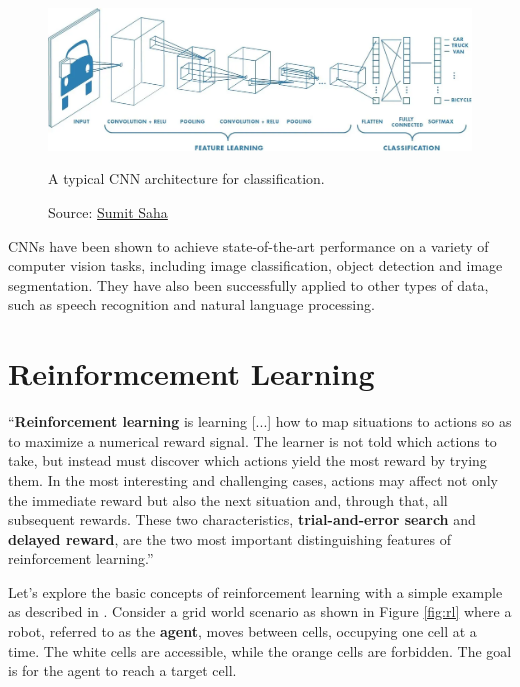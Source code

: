 \begin{figure}[h]
    \centering
    \includegraphics[width=\textwidth]{figures/ch3/8.cnn.png}
    \caption{A typical CNN architecture for classification.}
    \vspace{-10px}
    \caption*{\scriptsize{Source: \href{https://towardsdatascience.com/a-comprehensive-guide-to-convolutional-neural-networks-the-eli5-way-3bd2b1164a53}{Sumit Saha}}}
    \label{fig:cnn}
\end{figure}

CNNs have been shown to achieve state-of-the-art performance on
a variety of computer vision tasks, including image classification,
object detection and image segmentation.
They have also been successfully applied to other types of data,
such as speech recognition and natural language processing.

\section{Reinformcement Learning}

``\textbf{Reinforcement learning} is learning [...] how
to map situations to actions so
as to maximize a numerical reward signal.
The learner is not told which actions to
take, but instead must discover which actions
yield the most reward by trying them. In
the most interesting and challenging cases, actions may
affect not only the immediate
reward but also the next situation and,
through that, all subsequent rewards.
These two
characteristics, \textbf{trial-and-error search} and \textbf{delayed reward},
are the two most important
distinguishing features of reinforcement learning.'' \cite{sutton1998}

Let's explore the basic concepts of reinforcement learning with
a simple example as described in \cite{zhao2024RLBook}.
Consider a grid world scenario as shown in Figure \ref{fig:rl}
where a robot, referred to as
the \textbf{agent}, moves between cells, occupying one cell at a time.
The white cells are accessible, while the orange cells are forbidden.
The goal is for the agent to reach a target cell.

